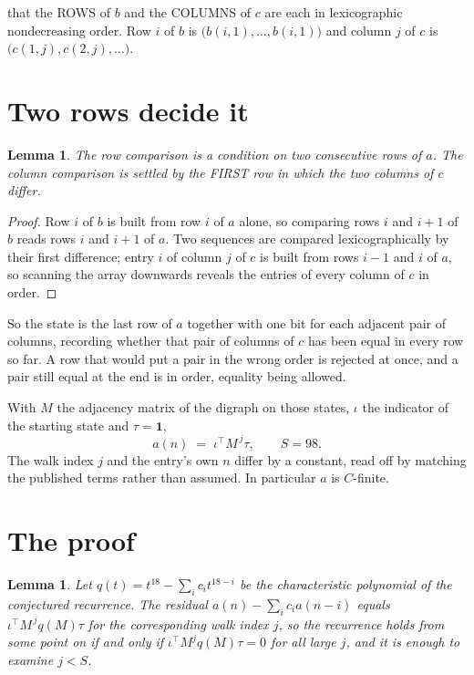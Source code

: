 \documentclass[11pt,a4paper]{article}
\theoremstyle{plain}
\newtheorem{lemma}[theorem]{Lemma}
\theoremstyle{definition}
\begin{document}
that the ROWS of $b$ and the COLUMNS of $c$ are each in lexicographic nondecreasing order. Row $i$ of $b$
is $\bigl(b(i,1),\dots,b(i,1)\bigr)$ and column $j$ of $c$ is
$\bigl(c(1,j),c(2,j),\dots\bigr)$.


\section{Two rows decide it}

\begin{lemma}\label{lem:win}
The row comparison is a condition on two consecutive rows of $a$. The column comparison is
settled by the FIRST row in which the two columns of $c$ differ.
\end{lemma}

\begin{proof}
Row $i$ of $b$ is built from row $i$ of $a$ alone, so comparing rows $i$ and $i+1$ of $b$ reads
rows $i$ and $i+1$ of $a$. Two sequences are compared lexicographically by their first
difference; entry $i$ of column $j$ of $c$ is built from rows $i-1$ and $i$ of $a$, so scanning
the array downwards reveals the entries of every column of $c$ in order.
\end{proof}

So the state is the last row of $a$ together with one bit for each adjacent pair of columns,
recording whether that pair of columns of $c$ has been equal in every row so far. A row that
would put a pair in the wrong order is rejected at once, and a pair still equal at the end is
in order, equality being allowed.

With $M$ the adjacency matrix of the digraph on those states, $\iota$ the indicator of the
starting state and $\tau=\mathbf{1}$,
\[
a(n)\;=\;\iota^{\!\top}M^{\,j}\tau ,\qquad S=98.
\]
The walk index $j$ and the entry's own $n$ differ by a constant, read off by matching the
published terms rather than assumed. In particular $a$ is $C$-finite.

\section{The proof}

\begin{lemma}\label{lem:crit}
Let $q(t)=t^{18}-\sum_i c_it^{18-i}$ be the characteristic polynomial of the
conjectured recurrence. The residual $a(n)-\sum_ic_ia(n-i)$ equals
$\iota^{\!\top}M^{\,j}q(M)\tau$ for the corresponding walk index $j$, so the recurrence
holds from some point on if and only if $\iota^{\!\top}M^{j}q(M)\tau=0$ for all large $j$,
and it is enough to examine $j<S$.
\end{lemma}
\end{document}
